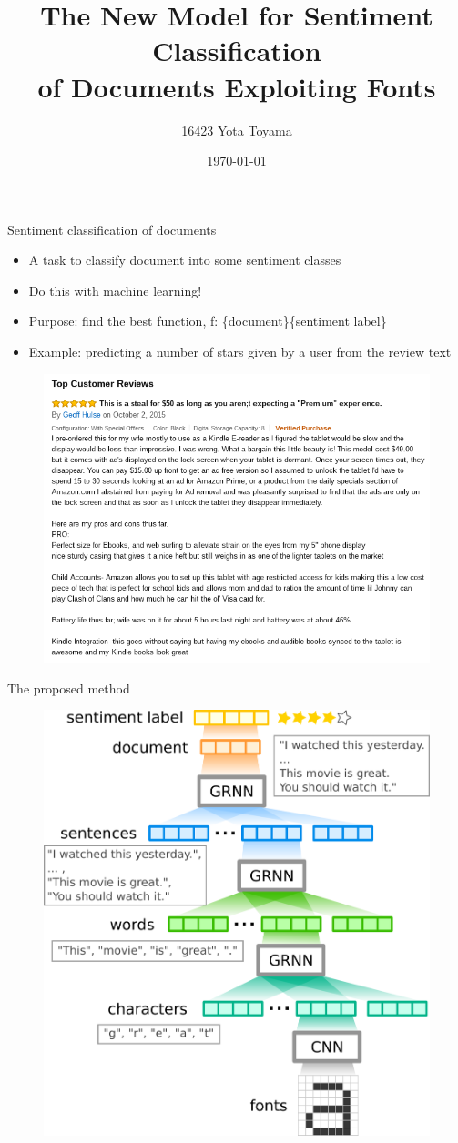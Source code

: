 \documentclass[aspectratio=43,unicode,10pt]{beamer}
\title[font2char2word2sent2doc]{
  The New Model for Sentiment Classification \\
  of Documents Exploiting Fonts}
\institute[CoIn Lab., TTI]{Computational Intelligence Laboratory, \\
                      Toyota Technological Institute}
\author{16423 Yota Toyama}
\date{\today}
\newcommand{\set}[1]{\{#1\}}
\begin{document}
\begin{frame}
\titlepage
\end{frame}

\begin{frame}{Sentiment classification of documents}
  \begin{itemize}
    \item A task to classify document into some sentiment classes
    \item Do this with machine learning!
    \item Purpose: find the best function,
          f: \set{document}\rightarrow\set{sentiment label}
    \item Example: predicting a number of stars given by a user
                   from the review text
  \end{itemize}
  \begin{figure}
    \includegraphics[width=0.6\linewidth]{fig/review.png}
  \end{figure}
\end{frame}

\begin{frame}{The proposed method}
  \begin{figure}
    \includegraphics[width=0.6\linewidth]{fig/fcwsd.pdf}
  \end{figure}
\end{frame}
\end{document}
